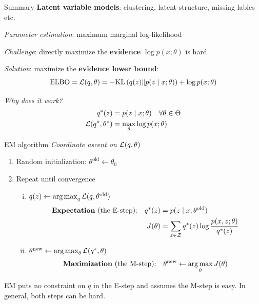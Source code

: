 \documentclass[usenames,dvipsnames,notes,11pt,aspectratio=169]{beamer}
\begin{document}
\begin{frame}
    {Summary}
    \textbf{Latent variable models}: clustering, latent structure, missing lables etc.

    \emph{Parameter estimation}: maximum marginal log-likelihood

    \emph{Challenge}: directly maximize the \textbf{evidence} $\log p(x;\theta)$ is hard

    \emph{Solution}: maximize the \textbf{evidence lower bound}:
    $$
    \text{ELBO} = \mathcal{L}(q, \theta) = -\text{KL}\left( q(z) \| p(z\mid x;\theta) \right) + \log p(x;\theta)
    $$

    \emph{Why does it work?}
    \begin{align*}
        q^*(z) &= p(z\mid x; \theta) \quad \forall \theta \in \Theta \\
        \mathcal{L}(q^*, \theta^*) &= \max_\theta \log p(x; \theta)
    \end{align*}
\end{frame}

\begin{frame}
    {EM algorithm}
    \emph{Coordinate ascent on $\mathcal{L}(q, \theta)$}\\
    \begin{enumerate}
        \item Random initialization: $\theta^{\text{old}} \leftarrow \theta_0$
        \item Repeat until convergence
            \begin{enumerate}[(i)]
                \item $q(z) \leftarrow \operatorname*{arg\,max}_q \mathcal{L}(q, \theta^{\text{old}})$
                    \begin{align*}
                    \text{\textbf{Expectation} (the E-step):} \quad
                    q^*(z) &= p(z\mid x;\theta^{\text{old}}) \\
                    J(\theta) &= \sum_{z\in\mathcal{Z}} q^*(z)\log \frac{p(x,z;\theta)}{q^*(z)}
                    \end{align*}
                \item $\theta^{\text{new}} \leftarrow \operatorname*{arg\,max}_\theta \mathcal{L}(q^*, \theta)$
                    \begin{align*}
                        \text{\textbf{Maximization} (the M-step):} \quad
                        \theta^{\text{new}} \leftarrow \operatorname*{arg\,max}_\theta J(\theta)
                    \end{align*}
            \end{enumerate}
    \end{enumerate}
        EM puts no constraint on $q$ in the E-step and assumes the M-step is easy.
        In general, both steps can be hard.
\end{frame}
\end{document}
